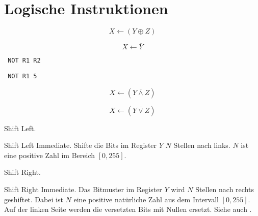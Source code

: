 \section{Logische Instruktionen}









\[
    X \gets (Y \oplus Z)
\]




\[
    X \gets \overline{Y}
\]
\begin{lstlisting}
 NOT R1 R2
\end{lstlisting}




\begin{lstlisting}
 NOT R1 5
\end{lstlisting}


\[
    X \gets (Y \overline{\land} Z)
\]





\[
    X \gets (Y \overline{\lor} Z)
\]




\glqq Shift Left\grqq.



\glqq Shift Left Immediate\grqq.
Shifte die Bits im Register $Y$ $N$ Stellen nach links. $N$ ist eine positive 
Zahl im Bereich $[0, 255]$.




\glqq Shift Right\grqq.


\glqq Shift Right Immediate\grqq.
Das Bitmuster im Register $Y$ wird $N$ Stellen nach rechts geshiftet.
Dabei ist $N$ eine positive natürliche Zahl aus dem Intervall $[0, 255]$.
Auf der linken Seite werden die versetzten Bits mit Nullen ersetzt.
Siehe auch .



